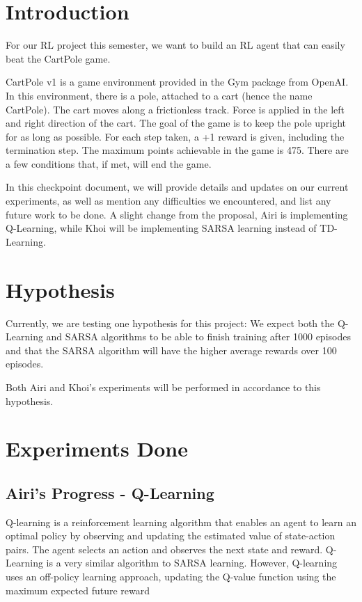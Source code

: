 \documentclass[nohyperref]{article}
\theoremstyle{plain}
\theoremstyle{definition}
\theoremstyle{remark}
\begin{document}

\section{Introduction}

For our RL project this semester, we want to build an RL agent that can easily beat the CartPole game.  

CartPole v1 is a game environment provided in the Gym package from OpenAI. In this environment, there is a pole, attached to a cart (hence the name CartPole). The cart moves along a frictionless track. Force is applied in the left and right direction of the cart.
The goal of the game is to keep the pole upright for as long as possible. For each step taken, a +1 reward is given, including the termination step. The maximum points achievable in the game is 475. There are a few conditions that, if met, will end the game.

In this checkpoint document, we will provide details and updates on our current experiments, as well as mention any difficulties we encountered, and list any future work to be done. A slight change from the proposal, Airi is implementing Q-Learning, while Khoi will be implementing SARSA learning instead of TD-Learning.

\section{Hypothesis}

Currently, we are testing one hypothesis for this project: We expect both the Q-Learning and SARSA algorithms to be able to finish training after 1000 episodes and that the SARSA algorithm will have the 
higher average rewards over 100 episodes.

Both Airi and Khoi's experiments will be performed in accordance to this hypothesis.

\section{Experiments Done}

\subsection{Airi's Progress - Q-Learning}
Q-learning is a reinforcement learning algorithm that enables an agent to learn an optimal policy by observing and updating the estimated value of state-action pairs. 
The agent selects an action and observes the next state and reward.
Q-Learning is a very similar algorithm to SARSA learning. However, Q-learning uses an off-policy learning approach, updating the Q-value function using the maximum expected future reward
\end{document}
